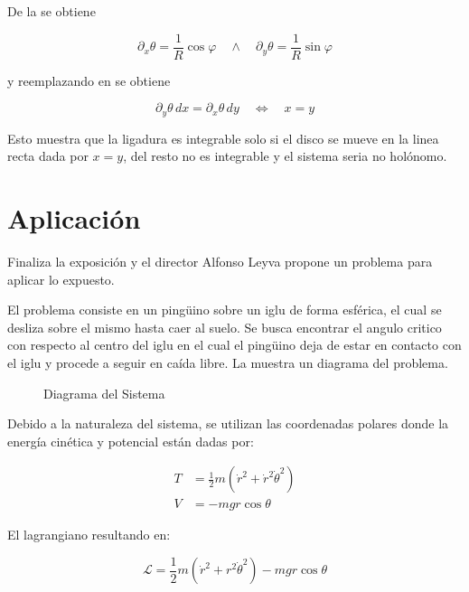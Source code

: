 \documentclass{article}
\theoremstyle{definition}
\begin{document}
De la  se obtiene

\begin{equation}
	\partial_x \theta = \frac{1}{R} \cos{\varphi} \quad \land \quad \partial_y \theta = \frac{1}{R} \sin{\varphi}
\end{equation}

y reemplazando en  se obtiene

\begin{equation}
	\partial_y \theta \, dx = \partial_x \theta \, dy \quad \iff \quad x = y
\end{equation}

Esto muestra que la ligadura es integrable solo si el disco se mueve en la linea recta dada por $x = y$, del resto no es integrable y el sistema seria no holónomo.

\section{Aplicación}
Finaliza la exposición y el director Alfonso Leyva propone un problema para aplicar lo expuesto.

El problema consiste en un pingüino sobre un iglu de forma esférica, el cual se desliza sobre el mismo hasta caer al suelo. Se busca encontrar el angulo critico con respecto al centro del iglu en el cual el pingüino deja de estar en contacto con el iglu y procede a seguir en caída libre. La  muestra un diagrama del problema.


\begin{figure}[htbp!]
	\caption{Diagrama del Sistema}
	\label{fig:iglu}
\end{figure}

Debido a la naturaleza del sistema, se utilizan las coordenadas polares donde la energía cinética y potencial están dadas por:

\begin{align}
	T &= \frac{1}{2} m \left(\dot{r}^2 + \dot{r}^2 \dot{\theta}^2 \right) \\
	V &= -mgr\cos{\theta}
\end{align}

El lagrangiano resultando en:

\begin{equation}
	\mathcal{L} = \frac{1}{2}m \left(\dot{r}^2 + r^2\dot{\theta}^2 \right) - mgr\cos{\theta}
\end{equation}
\end{document}
